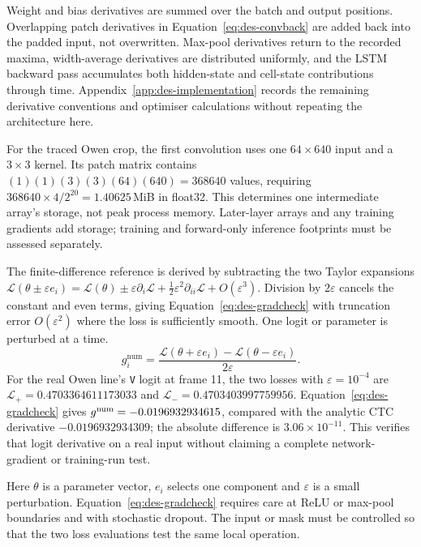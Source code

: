 Weight and bias derivatives are summed over the batch and output positions. Overlapping patch derivatives in Equation~\ref{eq:des-convback} are added back into the padded input, not overwritten. Max-pool derivatives return to the recorded maxima, width-average derivatives are distributed uniformly, and the LSTM backward pass accumulates both hidden-state and cell-state contributions through time. Appendix~\ref{app:des-implementation} records the remaining derivative conventions and optimiser calculations without repeating the architecture here.

For the traced Owen crop, the first convolution uses one $64\times640$ input and a $3\times3$ kernel. Its patch matrix contains $(1)(1)(3)(3)(64)(640)=368640$ values, requiring $368640\times4/2^{20}=1.40625$\,MiB in float32. This determines one intermediate array's storage, not peak process memory. Later-layer arrays and any training gradients add storage; training and forward-only inference footprints must be assessed separately.


The finite-difference reference is derived by subtracting the two Taylor expansions $\mathcal L(\theta\pm\varepsilon e_i)=\mathcal L(\theta)\pm\varepsilon\partial_i\mathcal L+\tfrac12\varepsilon^2\partial_{ii}\mathcal L+O(\varepsilon^3)$. Division by $2\varepsilon$ cancels the constant and even terms, giving Equation~\ref{eq:des-gradcheck} with truncation error $O(\varepsilon^2)$ where the loss is sufficiently smooth. One logit or parameter is perturbed at a time.
\begin{equation}
g_i^{\mathrm{num}}=\frac{\mathcal L(\theta+\varepsilon e_i)
-\mathcal L(\theta-\varepsilon e_i)}{2\varepsilon}.
\label{eq:des-gradcheck}
\end{equation}
For the real Owen line's \texttt{V} logit at frame 11, the two losses with $\varepsilon=10^{-4}$ are $\mathcal L_+=0.4703364611173033$ and $\mathcal L_-=0.4703403997759956$. Equation~\ref{eq:des-gradcheck} gives $g^{\rm num}=-0.0196932934615$, compared with the analytic CTC derivative $-0.0196932934309$; the absolute difference is $3.06\times10^{-11}$. This verifies that logit derivative on a real input without claiming a complete network-gradient or training-run test.

Here $\theta$ is a parameter vector, $e_i$ selects one component and $\varepsilon$ is a small perturbation. Equation~\ref{eq:des-gradcheck} requires care at ReLU or max-pool boundaries and with stochastic dropout. The input or mask must be controlled so that the two loss evaluations test the same local operation.


